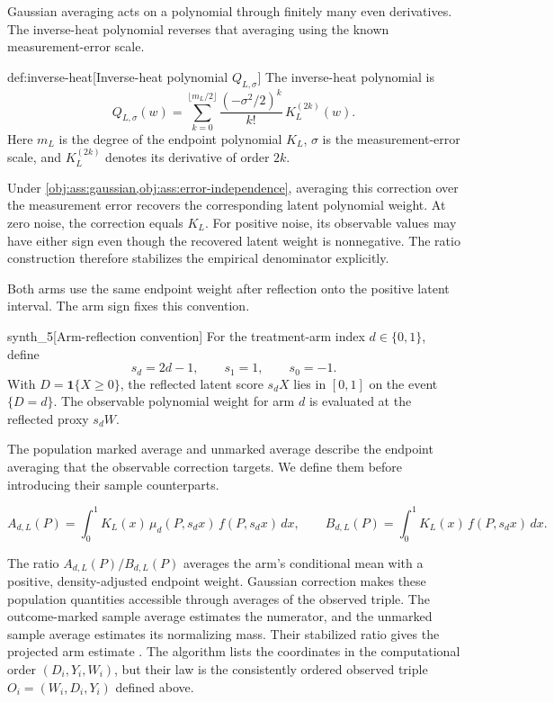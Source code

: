 Gaussian averaging acts on a polynomial through finitely many even derivatives. The inverse-heat polynomial  reverses that averaging using the known measurement-error scale.

\begin{definitionv}{def:inverse-heat}[Inverse-heat polynomial $Q_{L,\sigma}$]
The inverse-heat polynomial is
\[
Q_{L,\sigma}(w)
=
\sum_{k=0}^{\lfloor m_L/2\rfloor}
\frac{(-\sigma^2/2)^k}{k!}\,
K_L^{(2k)}(w).
\]
Here \(m_L\) is the degree of the endpoint polynomial \(K_L\), \(\sigma\) is the measurement-error scale, and \(K_L^{(2k)}\) denotes its derivative of order \(2k\).
\end{definitionv}

Under \cref{obj:ass:gaussian,obj:ass:error-independence}, averaging this correction over the measurement error recovers the corresponding latent polynomial weight. At zero noise, the correction equals \(K_L\). For positive noise, its observable values may have either sign even though the recovered latent weight is nonnegative. The ratio construction therefore stabilizes the empirical denominator explicitly.

Both arms use the same endpoint weight after reflection onto the positive latent interval. The arm sign  fixes this convention.

\begin{definitionv}{synth_5}[Arm-reflection convention]
For the treatment-arm index \(d\in\{0,1\}\), define
\[
s_d=2d-1,
\qquad s_1=1,\qquad s_0=-1.
\]
With \(D=\mathbf1\{X\ge0\}\), the reflected latent score \(s_dX\) lies in \([0,1]\) on the event \(\{D=d\}\). The observable polynomial weight for arm \(d\) is evaluated at the reflected proxy \(s_dW\).
\end{definitionv}

The population marked average  and unmarked average  describe the endpoint averaging that the observable correction targets. We define them before introducing their sample counterparts.

\[
A_{d,L}(P)
=\int_0^1 K_L(x)\,\mu_d(P,s_dx)\,f(P,s_dx)\,dx,
\qquad
B_{d,L}(P)
=\int_0^1 K_L(x)\,f(P,s_dx)\,dx.
\]

The ratio \(A_{d,L}(P)/B_{d,L}(P)\) averages the arm's conditional mean with a positive, density-adjusted endpoint weight. Gaussian correction makes these population quantities accessible through averages of the observed triple. The outcome-marked sample average  estimates the numerator, and the unmarked sample average  estimates its normalizing mass. Their stabilized ratio gives the projected arm estimate . The algorithm lists the coordinates in the computational order \((D_i,Y_i,W_i)\), but their law is the consistently ordered observed triple \(O_i=(W_i,D_i,Y_i)\) defined above.

